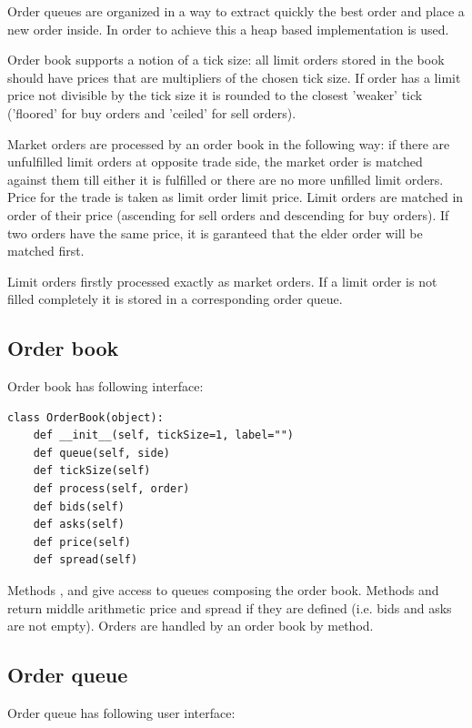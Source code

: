 \documentclass[a4paper,11pt]{article}
\newcommand{\tmtexttt}[1]{{\ttfamily{#1}}}
\begin{document}
Order queues are organized in a way to extract quickly the best order and place a new order inside. In order to achieve this a heap based implementation is used. 

Order book supports a notion of a tick size: all limit orders stored in the book should have prices that are multipliers of the chosen tick size. If order has a limit price not divisible by the tick size it is rounded to the closest 'weaker' tick ('floored' for buy orders and 'ceiled' for sell orders).

Market orders are processed by an order book in the following way: if there are unfulfilled limit orders at opposite trade side, the market order is matched against them till either it is fulfilled or there are no more unfilled limit orders. Price for the trade is taken as limit order limit price. Limit orders are matched in order of their price (ascending for sell orders and descending for buy orders). If two orders have the same price, it is garanteed that the elder order will be matched first.

Limit orders firstly processed exactly as market orders. If a limit order is not filled completely it is stored in a corresponding order queue.

\subsection{Order book}

Order book has following interface:

\begin{verbatim}
class OrderBook(object):
    def __init__(self, tickSize=1, label="")
    def queue(self, side)
    def tickSize(self)
    def process(self, order)
    def bids(self)
    def asks(self)
    def price(self)
    def spread(self)
\end{verbatim}

Methods \tmtexttt{bids}, \tmtexttt{asks} and \tmtexttt{queue} give access to queues composing the order book. Methods \tmtexttt{price} and \tmtexttt{spread} return middle arithmetic price and spread if they are defined (i.e. bids and asks are not empty). Orders are handled by an order book by \tmtexttt{process} method.

\subsection{Order queue}

Order queue has following user interface:
\end{document}
